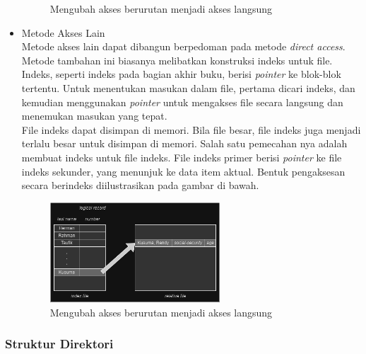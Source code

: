 \documentclass[12pt]{article}
\begin{document}
\begin{itemize}
\begin{figure}[h]
            \caption{Mengubah akses berurutan menjadi akses langsung}
        \end{figure}
    \item  Metode Akses Lain
        \\Metode akses lain dapat dibangun berpedoman pada metode \textit{direct access}. Metode tambahan ini biasanya melibatkan konstruksi indeks untuk file. Indeks, seperti indeks pada bagian akhir buku, berisi \textit{pointer} ke blok-blok tertentu. Untuk menentukan masukan dalam file, pertama dicari indeks, dan kemudian menggunakan \textit{pointer} untuk mengakses file secara langsung dan menemukan masukan yang tepat.
        \\File indeks dapat disimpan di memori. Bila file besar, file indeks juga menjadi terlalu besar untuk disimpan di memori. Salah satu pemecahan nya adalah membuat indeks untuk file indeks. File indeks primer berisi \textit{pointer} ke file indeks sekunder, yang menunjuk ke data item aktual. Bentuk pengaksesan secara berindeks diilustrasikan pada gambar di bawah.
        \begin{figure}[h]
			\centering
			\includegraphics[width=0.6\textwidth]{asset/gambar5.png}
            \caption{Mengubah akses berurutan menjadi akses langsung}
        \end{figure}
    \end{itemize}
    \subsubsection{Struktur Direktori}
\end{document}
